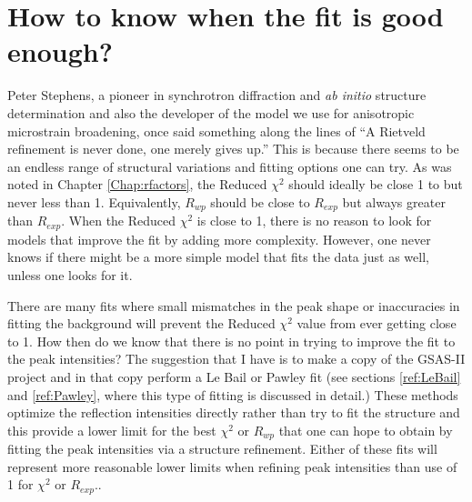 \section{How to know when the fit is good enough?}\label{ref:goodenough}

Peter Stephens, a pioneer in synchrotron diffraction and \textit{ab initio} structure determination and also the developer of the model we use for anisotropic microstrain broadening, once said something along the lines of ``A Rietveld refinement is never done, one merely gives up.'' This is because there seems to be an endless range of structural variations and fitting options one can try. As was noted in Chapter \ref{Chap:rfactors},  the Reduced $\chi^2$ should ideally be close 1 to but never less than 1. Equivalently, $R_{wp}$ should be close to $R_{exp}$ but always greater than $R_{exp}$. When the Reduced $\chi^2$ is close to 1, there is no reason to look for models that improve the fit by adding more complexity. However, one never knows if there might be a more simple model that fits the data just as well, unless one looks for it. 

There are many fits where small mismatches in the peak shape or inaccuracies in fitting the background will prevent the Reduced $\chi^2$ value from ever getting close to 1. How then do we know that there is no point in trying to improve the fit to the peak intensities? The suggestion that I have is to make a copy of the GSAS-II project and in that copy perform a Le Bail or Pawley fit (see sections \ref{ref:LeBail} and \ref{ref:Pawley}, where this type of fitting is discussed in detail.) These methods optimize the reflection intensities directly rather than try to fit the structure and this provide  a lower limit for the best $\chi^2$ or $R_{wp}$ that one can hope to obtain by fitting the peak intensities via a structure refinement. Either of these fits will represent more reasonable lower limits when refining peak intensities than use of 1 for $\chi^2$ or $R_{exp}$.\label{ref:beststruturefit}. 


